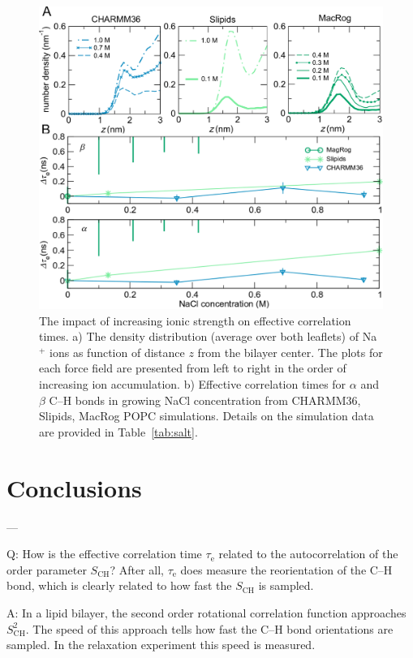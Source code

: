 \documentclass[journal=jpcbfk,manuscript=article,layout=twocolumn]{achemso}
\begin{document}

\begin{figure}[ht!]
\centering
\includegraphics[scale=0.36]{./figures/salt.pdf} 
\caption{The impact of increasing ionic strength on effective correlation times. a) The density distribution (average over both leaflets) of Na$^{+}$ ions as function of distance $z$ from the bilayer center. The plots for each force field are presented from left to right in the order of increasing ion accumulation. b) Effective correlation times for $\alpha$ and $\beta$ C--H bonds in growing NaCl concentration from CHARMM36, Slipids, MacRog POPC simulations. Details on the simulation data are provided in Table~\ref{tab:salt}.}
\label{fig:salt}
\end{figure}


\section{Conclusions}

---

Q: How is the effective correlation time $\tau_\mathrm e$ related to the autocorrelation of the order parameter $S_\mathrm{CH}$?
After all, $\tau_\mathrm e$ does measure the reorientation of the C--H bond, which is clearly related to how fast the $S_\mathrm{CH}$ is sampled.

A: In a lipid bilayer, the second order rotational correlation function approaches $S^2_\mathrm{CH}$. The speed of this approach tells how fast the C--H bond orientations are sampled. In the relaxation experiment this speed is measured.
\end{document}
